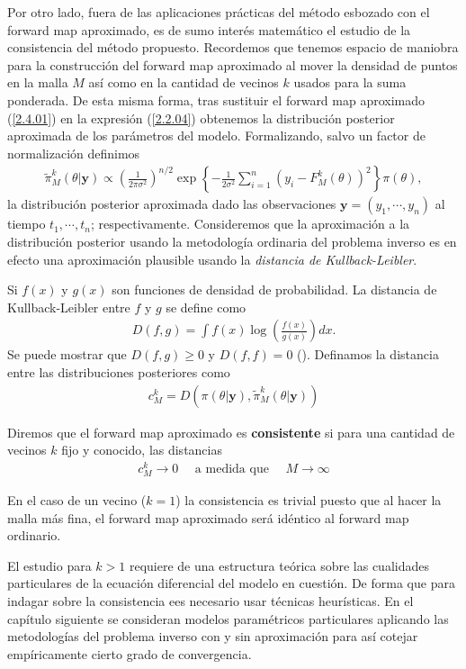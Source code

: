 Por otro lado, fuera de las aplicaciones prácticas del método esbozado con el forward map aproximado, es de sumo interés matemático el estudio de la consistencia del método propuesto. Recordemos que tenemos espacio de maniobra para la construcción del forward map aproximado al mover la densidad de puntos en la malla $M$ así como en la cantidad de vecinos $k$ usados para la suma ponderada. De esta misma forma, tras sustituir el forward map aproximado (\ref{2.4.01}) en la expresión (\ref{2.2.04}) obtenemos la distribución posterior aproximada de los parámetros del modelo. Formalizando, salvo un factor de normalización definimos
\begin{align*}
    \tilde{\pi}^{k}_M(\theta|\mathbf{y}) \propto \left(\frac{1}{2\pi \sigma^2}\right) ^{n/2}\exp \left \{  -\frac{1}{2\sigma^2}\sum_{i = 1}^{n} \left(y_i - F^k_M(\theta)\right)^2 \right \}\pi(\theta),
\end{align*}
la distribución posterior aproximada dado las observaciones $\mathbf{y} = (y_1,\cdots, y_n)$ al tiempo $t_1, \cdots, t_n$; respectivamente. Consideremos que la aproximación a la distribución posterior usando la metodología ordinaria del problema inverso es en efecto una aproximación plausible usando la \textit{distancia de Kullback-Leibler}.

Si $f(x)$ y $g(x)$ son funciones de densidad de probabilidad. La distancia de Kullback-Leibler entre $f$ y $g$ se define como
\begin{align*}
    D(f,g) = \int f(x)\log \left(\frac{f(x)}{g(x)}\right) dx.
\end{align*}
Se puede mostrar que $D(f,g) \geq 0$ y $D(f,f) = 0$ (\cite{wasserman2006all}).
Definamos la distancia entre las distribuciones posteriores como
\begin{align*}
    c^k_M = D \left( \pi(\theta|\mathbf{y}),\tilde{\pi}^{k}_M(\theta|\mathbf{y})\right)
\end{align*}

Diremos que el forward map aproximado es \textbf{consistente} si para una cantidad de vecinos $k$ fijo y conocido, las distancias 
\begin{align*}
    c^k_M \rightarrow 0 \:\:\:\:\:\: \text{a medida que}\:\:\:\:\:\: M \rightarrow \infty
\end{align*}

En el caso de un vecino ($k = 1$) la consistencia es trivial puesto que al hacer la malla más fina, el forward map aproximado será idéntico al forward map ordinario.

El estudio para $k > 1$ requiere de una estructura teórica sobre las cualidades particulares de la ecuación diferencial del modelo en cuestión. De forma que para indagar sobre la consistencia ees necesario usar técnicas heurísticas. En el capítulo siguiente se consideran modelos paramétricos particulares aplicando las metodologías del problema inverso con y sin aproximación para así cotejar empíricamente cierto grado de convergencia.









